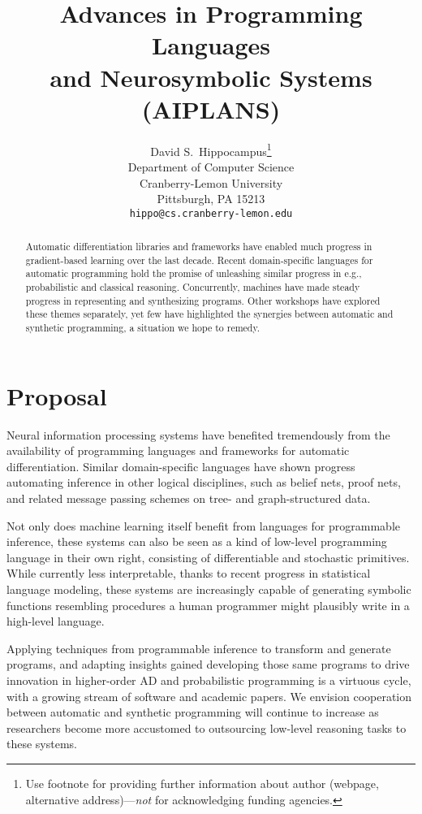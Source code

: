 \documentclass{article}
\title{Advances in Programming Languages\\ and Neurosymbolic Systems (AIPLANS)}
\author{%
    David S.~Hippocampus\thanks{Use footnote for providing further information
    about author (webpage, alternative address)---\emph{not} for acknowledging
    funding agencies.} \\
    Department of Computer Science\\
    Cranberry-Lemon University\\
    Pittsburgh, PA 15213 \\
    \texttt{hippo@cs.cranberry-lemon.edu} \\
}
\begin{document}
    \maketitle

    \begin{abstract}
        Automatic differentiation libraries and frameworks have enabled much progress in gradient-based learning over the last decade. Recent domain-specific languages for automatic programming hold the promise of unleashing similar progress in e.g., probabilistic and classical reasoning. Concurrently, machines have made steady progress in representing and synthesizing programs. Other workshops have explored these themes separately, yet few have highlighted the synergies between automatic and synthetic programming, a situation we hope to remedy.
    \end{abstract}

    \section{Proposal}

    Neural information processing systems have benefited tremendously from the availability of programming languages and frameworks for automatic differentiation. Similar domain-specific languages have shown progress automating inference in other logical disciplines, such as belief nets, proof nets, and related message passing schemes on tree- and graph-structured data.

    Not only does machine learning itself benefit from languages for programmable inference, these systems can also be seen as a kind of low-level programming language in their own right, consisting of differentiable and stochastic primitives. While currently less interpretable, thanks to recent progress in statistical language modeling, these systems are increasingly capable of generating symbolic functions resembling procedures a human programmer might plausibly write in a high-level language.

    Applying techniques from programmable inference to transform and generate programs, and adapting insights gained developing those same programs to drive innovation in higher-order AD and probabilistic programming is a virtuous cycle, with a growing stream of software and academic papers. We envision cooperation between automatic and synthetic programming will continue to increase as researchers become more accustomed to outsourcing low-level reasoning tasks to these systems.
\end{document}
